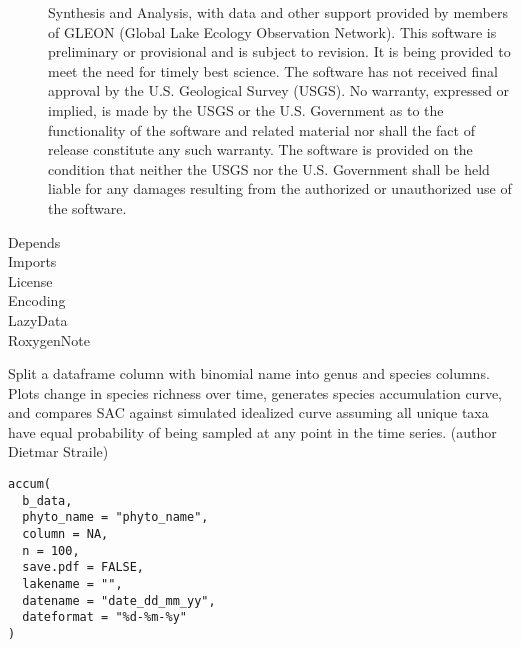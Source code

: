 \documentclass[a4paper]{book}
\begin{document}
\begin{description}
{Synthesis and Analysis, with data and other support provided by members of GLEON
(Global Lake Ecology Observation Network). This software is preliminary or provisional and
is subject to revision. It is being provided to meet the need for timely best science.
The software has not received final approval by the U.S. Geological Survey (USGS).
No warranty, expressed or implied, is made by the USGS or the U.S. Government as to the
functionality of the software and related material nor shall the fact of release constitute
any such warranty. The software is provided on the condition that neither the USGS nor the U.S.
Government shall be held liable for any damages resulting from the authorized or unauthorized
use of the software.}
\item[Depends]
\item[Imports]
\item[License]
\item[Encoding]
\item[LazyData]
\item[RoxygenNote]
\end{description}
%
\begin{Description}\relax
Split a dataframe column with binomial name into genus and species columns.
Plots change in species richness over time, generates species accumulation curve, and
compares SAC against simulated idealized curve assuming all unique taxa have equal probability
of being sampled at any point in the time series. (author Dietmar Straile)
\end{Description}
%
\begin{Usage}
\begin{verbatim}
accum(
  b_data,
  phyto_name = "phyto_name",
  column = NA,
  n = 100,
  save.pdf = FALSE,
  lakename = "",
  datename = "date_dd_mm_yy",
  dateformat = "%d-%m-%y"
)
\end{verbatim}
\end{Usage}
%
\end{document}
